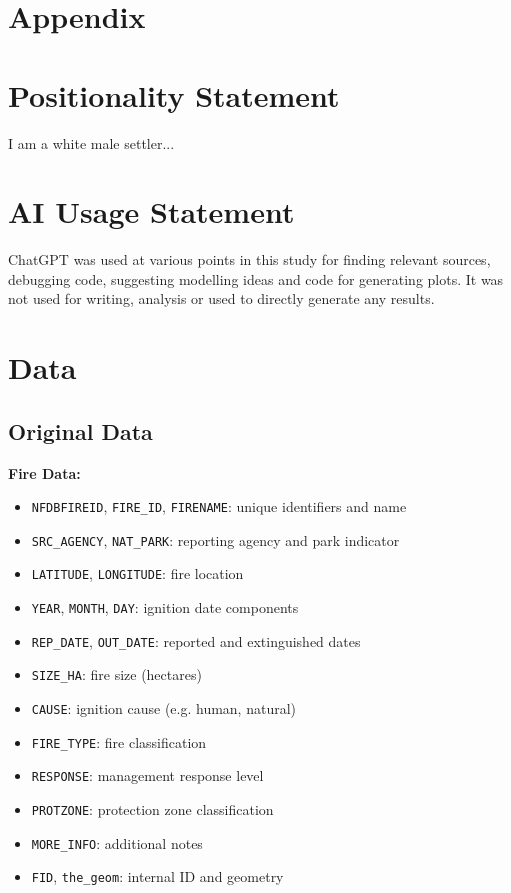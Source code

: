 \appendix
\section*{Appendix}
\section{Positionality Statement}
I am a white male settler...

\section{AI Usage Statement}
ChatGPT was used at various points in this study for finding relevant sources, debugging code, suggesting modelling ideas and code for generating plots. It was not used for writing, analysis or used to directly generate any results.

\section{Data}\label{sec:data_appendix}

\subsection{Original Data}

\cite{cnfdb} \textbf{Fire Data:}
\begin{itemize}
    \item \texttt{NFDBFIREID}, \texttt{FIRE\_ID}, \texttt{FIRENAME}: unique identifiers and name
    \item \texttt{SRC\_AGENCY}, \texttt{NAT\_PARK}: reporting agency and park indicator
    \item \texttt{LATITUDE}, \texttt{LONGITUDE}: fire location
    \item \texttt{YEAR}, \texttt{MONTH}, \texttt{DAY}: ignition date components
    \item \texttt{REP\_DATE}, \texttt{OUT\_DATE}: reported and extinguished dates
    \item \texttt{SIZE\_HA}: fire size (hectares)
    \item \texttt{CAUSE}: ignition cause (e.g. human, natural)
    \item \texttt{FIRE\_TYPE}: fire classification
    \item \texttt{RESPONSE}: management response level
    \item \texttt{PROTZONE}: protection zone classification
    \item \texttt{MORE\_INFO}: additional notes
    \item \texttt{FID}, \texttt{the\_geom}: internal ID and geometry
\end{itemize}

